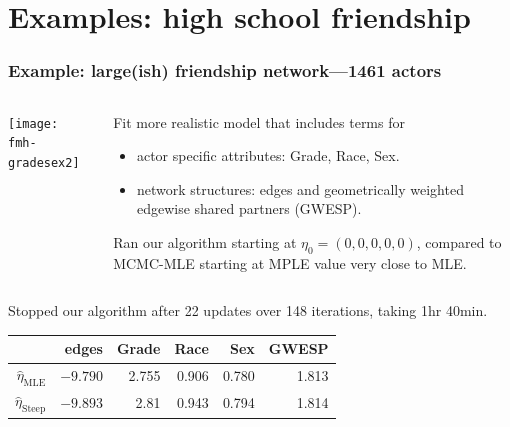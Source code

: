 \documentclass[ 10pt]{beamer}
\newcommand{\etaMLE}{\hat{\eta}_{\textrm{MLE}}}
\begin{document}
\section{Examples: high school friendship}

\frame
{
  \frametitle{Example: large(ish) friendship network---1461 actors}  
\begin{columns}[t]
\begin{column}[T]{0.3\textwidth}
\texttt{[image: fmh-gradesex2]}
\end{column}

\begin{column}[T]{0.7\textwidth}
Fit more realistic model that includes terms for
\vspace{1mm}
\begin{itemize}
\item actor specific attributes: Grade, Race, Sex.
\vspace{1mm}

\item network structures: edges and geometrically weighted edgewise shared partners (GWESP).
\vspace{5mm}
\end{itemize}
\pause

Ran our algorithm starting at $\eta_0 = (0,0,0,0,0)$, compared to MCMC-MLE starting at MPLE value very close to MLE.
\end{column}
\end{columns}
\vspace{5mm}

\pause
Stopped our algorithm after 22 updates over 148 iterations, taking 1hr 40min.
\begin{table}
\begin{center} 

\begin{tabular}{rrrrrr}
  \hline
 & edges & Grade & Race & Sex & GWESP \\ 
  \hline
$\etaMLE$ & $-9.790$ & 2.755 & 0.906 & 0.780 & 1.813 \\ 
$\hat{\eta}_{\textrm{Steep}}$ & 	$-9.893$	&	2.81	&	0.943	&	0.794	&	1.814\\ 
   \hline
\end{tabular}\label{T:FauxMagnolia}
\end{center}
\end{table}


}
\end{document}
